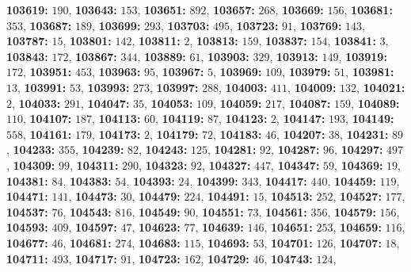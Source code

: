 \textsf{\bfseries 103619:} $190$, \textsf{\bfseries 103643:} $153$, \textsf{\bfseries 103651:} $892$, \textsf{\bfseries 103657:} $268$, \textsf{\bfseries 103669:} $156$, \textsf{\bfseries 103681:} $353$, \textsf{\bfseries 103687:} $189$, \textsf{\bfseries 103699:} $293$, \textsf{\bfseries 103703:} $495$, \textsf{\bfseries 103723:} $91$, \textsf{\bfseries 103769:} $143$, \textsf{\bfseries 103787:} $15$, \textsf{\bfseries 103801:} $142$, \textsf{\bfseries 103811:} $2$, \textsf{\bfseries 103813:} $159$, \textsf{\bfseries 103837:} $154$, \textsf{\bfseries 103841:} $3$, \textsf{\bfseries 103843:} $172$, \textsf{\bfseries 103867:} $344$, \textsf{\bfseries 103889:} $61$, \textsf{\bfseries 103903:} $329$, \textsf{\bfseries 103913:} $149$, \textsf{\bfseries 103919:} $172$, \textsf{\bfseries 103951:} $453$, \textsf{\bfseries 103963:} $95$, \textsf{\bfseries 103967:} $5$, \textsf{\bfseries 103969:} $109$, \textsf{\bfseries 103979:} $51$, \textsf{\bfseries 103981:} $13$, \textsf{\bfseries 103991:} $53$, \textsf{\bfseries 103993:} $273$, \textsf{\bfseries 103997:} $288$, \textsf{\bfseries 104003:} $411$, \textsf{\bfseries 104009:} $132$, \textsf{\bfseries 104021:} $2$, \textsf{\bfseries 104033:} $291$, \textsf{\bfseries 104047:} $35$, \textsf{\bfseries 104053:} $109$, \textsf{\bfseries 104059:} $217$, \textsf{\bfseries 104087:} $159$, \textsf{\bfseries 104089:} $110$, \textsf{\bfseries 104107:} $187$, \textsf{\bfseries 104113:} $60$, \textsf{\bfseries 104119:} $87$, \textsf{\bfseries 104123:} $2$, \textsf{\bfseries 104147:} $193$, \textsf{\bfseries 104149:} $558$, \textsf{\bfseries 104161:} $179$, \textsf{\bfseries 104173:} $2$, \textsf{\bfseries 104179:} $72$, \textsf{\bfseries 104183:} $46$, \textsf{\bfseries 104207:} $38$, \textsf{\bfseries 104231:} $89$, \textsf{\bfseries 104233:} $355$, \textsf{\bfseries 104239:} $82$, \textsf{\bfseries 104243:} $125$, \textsf{\bfseries 104281:} $92$, \textsf{\bfseries 104287:} $96$, \textsf{\bfseries 104297:} $497$, \textsf{\bfseries 104309:} $99$, \textsf{\bfseries 104311:} $290$, \textsf{\bfseries 104323:} $92$, \textsf{\bfseries 104327:} $447$, \textsf{\bfseries 104347:} $59$, \textsf{\bfseries 104369:} $19$, \textsf{\bfseries 104381:} $84$, \textsf{\bfseries 104383:} $54$, \textsf{\bfseries 104393:} $24$, \textsf{\bfseries 104399:} $343$, \textsf{\bfseries 104417:} $440$, \textsf{\bfseries 104459:} $119$, \textsf{\bfseries 104471:} $141$, \textsf{\bfseries 104473:} $30$, \textsf{\bfseries 104479:} $224$, \textsf{\bfseries 104491:} $15$, \textsf{\bfseries 104513:} $252$, \textsf{\bfseries 104527:} $177$, \textsf{\bfseries 104537:} $76$, \textsf{\bfseries 104543:} $816$, \textsf{\bfseries 104549:} $90$, \textsf{\bfseries 104551:} $73$, \textsf{\bfseries 104561:} $356$, \textsf{\bfseries 104579:} $156$, \textsf{\bfseries 104593:} $409$, \textsf{\bfseries 104597:} $47$, \textsf{\bfseries 104623:} $77$, \textsf{\bfseries 104639:} $146$, \textsf{\bfseries 104651:} $253$, \textsf{\bfseries 104659:} $116$, \textsf{\bfseries 104677:} $46$, \textsf{\bfseries 104681:} $274$, \textsf{\bfseries 104683:} $115$, \textsf{\bfseries 104693:} $53$, \textsf{\bfseries 104701:} $126$, \textsf{\bfseries 104707:} $18$, \textsf{\bfseries 104711:} $493$, \textsf{\bfseries 104717:} $91$, \textsf{\bfseries 104723:} $162$, \textsf{\bfseries 104729:} $46$, \textsf{\bfseries 104743:} $124$, 
